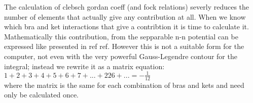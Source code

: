 The calculation of clebsch gordan coeff (and fock relations) severly reduces the number of elements that actually give any contribution at all. 
When we know which bra and ket interactions that give a contribtion it is time to calculate it. 
Mathematically this contribution, from the sepparable n-n potential can be expressed like presented in ref ref.
However this is not a suitable form for the computer, not even with the very powerful Gauss-Legendre contour for the integral; instead we rewrite it as a matrix equation:
$1+2+3+4+5+6+7+...+226+... = - \frac{1}{12}$\\
where the matrix is the same for each combination of bras and kets and need only be calculated once.


